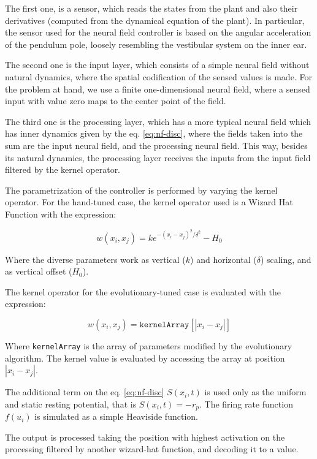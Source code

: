 The first one, is a sensor, which reads the states from the plant and
also their derivatives (computed from the dynamical equation of the
plant). In particular, the sensor used for the neural field controller
is based on the angular acceleration of the pendulum pole, loosely
resembling the vestibular system on the inner ear.

The second one is the input layer, which consists of a simple neural
field without natural dynamics, where the spatial codification of the
sensed values is made. For the problem at hand, we use a finite
one-dimensional neural field, where a sensed input with value zero
maps to the center point of the field.

The third one is the processing layer, which has a more typical neural
field which has inner dynamics given by the eq. \ref{eq:nf-disc},
where the fields taken into the sum are the input neural field, and
the processing neural field. This way, besides its natural dynamics,
the processing layer receives the inputs from the input field filtered
by the kernel operator.

The parametrization of the controller is performed by varying the
kernel operator. For the hand-tuned case, the kernel operator used is
a Wizard Hat Function with the expression:

\begin{equation}
  \label{eq:wizard-hat}
  w(x_i,x_j)=ke^{-(x_i-x_j)^2/\delta^2}-H_0
\end{equation}

Where the diverse parameters work as vertical ($k$) and horizontal
($\delta$) scaling, and as vertical offset ($H_0$).

The kernel operator for the evolutionary-tuned case is evaluated with
the expression:

\begin{equation}
  w(x_i,x_j)=\mathtt{kernelArray}[|x_i-x_j|]
\end{equation}

Where \texttt{kernelArray} is the array of parameters modified by the
evolutionary algorithm. The kernel value is evaluated by accessing the
array at position $|x_i-x_j|$.

The additional term on the eq. \ref{eq:nf-disc} $S(x_i,t)$ is used
only as the uniform and static resting potential, that is
$S(x_i,t)=-r_p$.  The firing rate function $f(u_i)$ is simulated as a
simple Heaviside function.

The output is processed taking the position with highest activation on
the processing filtered by another wizard-hat function, and decoding
it to a value.

